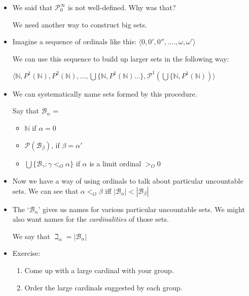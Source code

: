 \documentclass[justified]{tufte-handout}
\begin{document}
\begin{itemize}


\item We said that $\mathcal{P}^\infty_0$ is not well-defined. Why was that?

We need another way to construct big sets.


\item Imagine a sequence of ordinals like this: $\langle 0, 0', 0'', .... , \omega, \omega' \rangle$

We can use this sequence to build up larger sets in the following way: 

$\langle \mathbb{N}, P^1(\mathbb{N}), P^2(\mathbb{N}),..., \bigcup\{\mathbb{N}, P^1(\mathbb{N})...\}, \mathcal{P}^1(\bigcup\{\mathbb{N}, P^1(\mathbb{N})) \rangle $


\item We can systematically name sets formed by this procedure.

Say that $\mathcal{B}_{\alpha}$ = 

\begin{itemize}

\item $\mathbb{N}$ if $\alpha = 0$

\item $\mathcal{P}(\mathcal{B}_\beta)$, if $\beta = \alpha'$

\item $\bigcup \{\mathcal{B}_\gamma: \gamma <_O \alpha\}$ if $\alpha$ is a limit ordinal $>_O 0$ 

\end{itemize}


\item Now we have a way of using ordinals to talk about particular uncountable sets. We can see that $\alpha <_O \beta$ iff $|\mathcal{B}_\alpha| < |\mathcal{B}_\beta |$




\item The `$\mathcal{B}_\alpha$' gives us names for various particular uncountable sets. We might also want names for the \emph{cardinalities} of those sets.


We say that $\beth_\alpha = |\mathcal{B}_\alpha|$




\item Exercise: 


\begin{enumerate}
\item Come up with a large cardinal with your group.


\item Order the large cardinals suggested by each group.

\end{enumerate}



\end{itemize}
\end{document}
